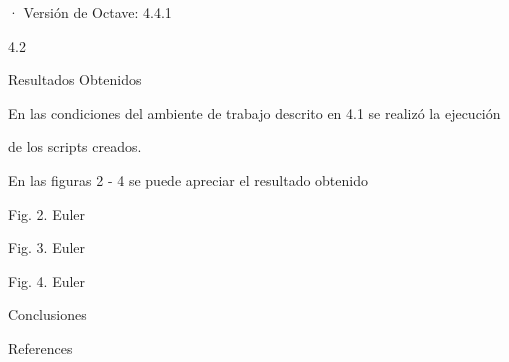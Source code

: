 \documentclass[a4paper,portrait,12pt]{article}
\begin{document}
\begin{flushleft}
· Versión de Octave: 4.4.1
\end{flushleft}





4.2





\begin{flushleft}
Resultados Obtenidos
\end{flushleft}





\begin{flushleft}
En las condiciones del ambiente de trabajo descrito en 4.1 se realizó la ejecución
\end{flushleft}


\begin{flushleft}
de los scripts creados.
\end{flushleft}


\begin{flushleft}
En las figuras 2 - 4 se puede apreciar el resultado obtenido
\end{flushleft}


\begin{flushleft}
Fig. 2. Euler
\end{flushleft}





\begin{flushleft}
\newpage
Fig. 3. Euler
\end{flushleft}





\begin{flushleft}
Fig. 4. Euler
\end{flushleft}










\begin{flushleft}
Conclusiones
\end{flushleft}





\begin{flushleft}
\newpage
References
\end{flushleft}
\end{document}
